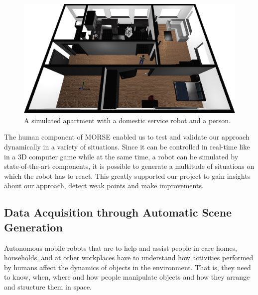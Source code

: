 \documentclass[conference]{IEEEtran}
\begin{document}
\begin{figure}[H]
      \centering
      \includegraphics[width=0.9\linewidth]{morse_apartment.png}
      \caption{A simulated apartment with a domestic service robot and a person.}
      \label{fig|apartment}
\end{figure}

The human component of MORSE enabled us to test and validate our approach
dynamically in a variety of situations. Since it can be controlled in real-time
like in a 3D computer game while at the same time, a robot can be simulated by
state-of-the-art components, it is possible to generate a multitude of
situations on which the robot has to react. This greatly supported our project
to gain insights about our approach, detect weak points and make improvements.

\subsection{Data Acquisition through Automatic Scene Generation}
\label{scenario3}

Autonomous mobile robots that are to help and assist people in care homes,
households, and at other workplaces have to understand how activities performed
by humans affect the dynamics of objects in the environment. That is, they need
to know, when, where and how people manipulate objects and how they arrange and
structure them in space.
\end{document}
